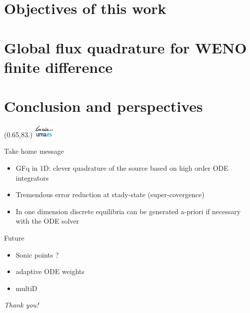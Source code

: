 \documentclass[aspectratio=169,9pt,mathserif]{beamer}
\newcommand{\MyLogoa}{%
 \begin{textblock}{14}(0.65,83.)%
  \includegraphics[width=1cm,angle=00]{logos-Inria-UMA} 
 \end{textblock}

}
\begin{document}
\section[Intro]{Objectives of this work}





\section[WENO GFq]{Global flux quadrature for WENO finite difference}



 
      


\section[End]{Conclusion and perspectives}

  

 \begin{frame}{} 
\MyLogoa

\vspace{0.2cm}
\begin{block}{Take home message}
\begin{itemize}
\item GFq in 1D:  clever   quadrature of
the source based on high order ODE integrators

\vspace{0.1cm}

\item Tremendous error reduction  at stady-state (super-covergence)

\vspace{0.1cm}


\item  In one dimension  discrete equilibria can be generated a-priori if necessary   with the ODE solver

 
\end{itemize}
\end{block} 


\vspace{0.5cm}

\begin{alertblock}{Future}
\begin{itemize}
\item   Sonic points ? 

\vspace{0.1cm}

\item adaptive ODE weights

\vspace{0.1cm}

\item multiD 
 \end{itemize}
 \end{alertblock}
 
\vspace{0.2cm}
\begin{center}
	\textit{Thank you!}
\end{center}

 \end{frame}
\end{document}
